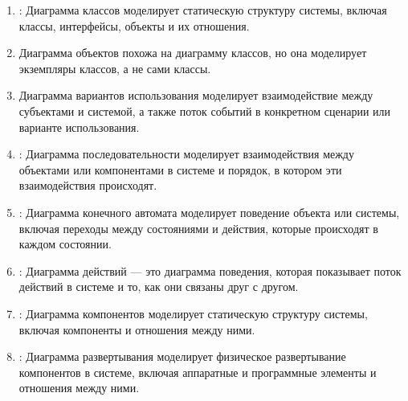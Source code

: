\documentclass[letterpaper,10pt,russian]{sphinxmanual}
\begin{document}
\begin{enumerate}
%
\item {} 
\sphinxAtStartPar
{}: Диаграмма классов моделирует статическую структуру системы, включая классы, интерфейсы, объекты и их отношения.

\item {} 
\sphinxAtStartPar
{} Диаграмма объектов похожа на диаграмму классов, но она моделирует экземпляры классов, а не сами классы.

\item {} 
\sphinxAtStartPar
{} Диаграмма вариантов использования моделирует взаимодействие между субъектами и системой, а также поток событий в конкретном сценарии или варианте использования.

\item {} 
\sphinxAtStartPar
{}: Диаграмма последовательности моделирует взаимодействия между объектами или компонентами в системе и порядок, в котором эти взаимодействия происходят.

\item {} 
\sphinxAtStartPar
{}: Диаграмма конечного автомата моделирует поведение объекта или системы, включая переходы между состояниями и действия, которые происходят в каждом состоянии.

\item {} 
\sphinxAtStartPar
{}: Диаграмма действий — это диаграмма поведения, которая показывает поток действий в системе и то, как они связаны друг с другом.

\item {} 
\sphinxAtStartPar
{}: Диаграмма компонентов моделирует статическую структуру системы, включая компоненты и отношения между ними.

\item {} 
\sphinxAtStartPar
{}: Диаграмма развертывания моделирует физическое развертывание компонентов в системе, включая аппаратные и программные элементы и отношения между ними.

\end{enumerate}
\end{document}
